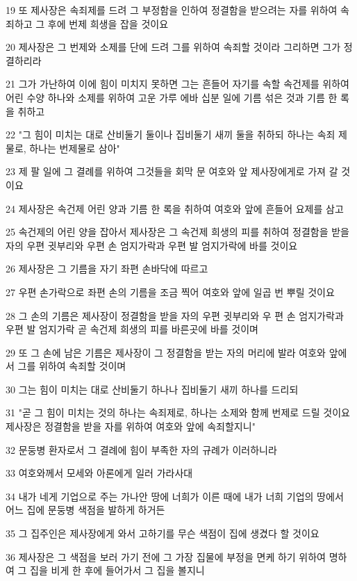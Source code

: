 \par 19 또 제사장은 속죄제를 드려 그 부정함을 인하여 정결함을 받으려는 자를 위하여 속죄하고 그 후에 번제 희생을 잡을 것이요
\par 20 제사장은 그 번제와 소제를 단에 드려 그를 위하여 속죄할 것이라 그리하면 그가 정결하리라
\par 21 그가 가난하여 이에 힘이 미치지 못하면 그는 흔들어 자기를 속할 속건제를 위하여 어린 수양 하나와 소제를 위하여 고운 가루 에바 십분 일에 기름 섞은 것과 기름 한 록을 취하고
\par 22 "그 힘이 미치는 대로 산비둘기 둘이나 집비둘기 새끼 둘을 취하되 하나는 속죄 제물로, 하나는 번제물로 삼아"
\par 23 제 팔 일에 그 결례를 위하여 그것들을 회막 문 여호와 앞 제사장에게로 가져 갈 것이요
\par 24 제사장은 속건제 어린 양과 기름 한 록을 취하여 여호와 앞에 흔들어 요제를 삼고
\par 25 속건제의 어린 양을 잡아서 제사장은 그 속건제 희생의 피를 취하여 정결함을 받을 자의 우편 귓부리와 우편 손 엄지가락과 우편 발 엄지가락에 바를 것이요
\par 26 제사장은 그 기름을 자기 좌편 손바닥에 따르고
\par 27 우편 손가락으로 좌편 손의 기름을 조금 찍어 여호와 앞에 일곱 번 뿌릴 것이요
\par 28 그 손의 기름은 제사장이 정결함을 받을 자의 우편 귓부리와 우 편 손 엄지가락과 우편 발 엄지가락 곧 속건제 희생의 피를 바른곳에 바를 것이며
\par 29 또 그 손에 남은 기름은 제사장이 그 정결함을 받는 자의 머리에 발라 여호와 앞에서 그를 위하여 속죄할 것이며
\par 30 그는 힘이 미치는 대로 산비둘기 하나나 집비둘기 새끼 하나를 드리되
\par 31 "곧 그 힘이 미치는 것의 하나는 속죄제로, 하나는 소제와 함께 번제로 드릴 것이요 제사장은 정결함을 받을 자를 위하여 여호와 앞에 속죄할지니"
\par 32 문둥병 환자로서 그 결례에 힘이 부족한 자의 규례가 이러하니라
\par 33 여호와께서 모세와 아론에게 일러 가라사대
\par 34 내가 네게 기업으로 주는 가나안 땅에 너희가 이른 때에 내가 너희 기업의 땅에서 어느 집에 문둥병 색점을 발하게 하거든
\par 35 그 집주인은 제사장에게 와서 고하기를 무슨 색점이 집에 생겼다 할 것이요
\par 36 제사장은 그 색점을 보러 가기 전에 그 가장 집물에 부정을 면케 하기 위하여 명하여 그 집을 비게 한 후에 들어가서 그 집을 볼지니
